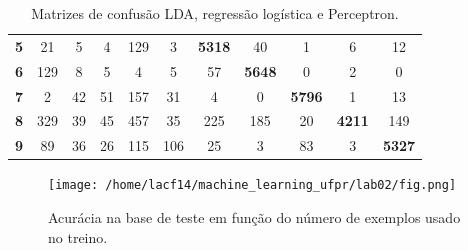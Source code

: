 \documentclass[
	12pt,				%
	openright,			%
	twoside,			%
	a4paper,			%
	english,			%
	brazil,				%
	svgnames
	]{abntex2}\usepackage[]{graphicx}\usepackage[]{color}
\begin{document}
\begin{table}[h]
\begin{tabular}{rcccccccccc}
\multicolumn{1}{r|}{\textbf{5}}          & 21                                 & 5                                  & 4                                  & 129                                & \multicolumn{1}{c|}{3}             & \multicolumn{1}{c|}{\textbf{5318}} & 40                                 & 1                                  & 6                                  & 12                                 \\ \cline{7-8}
\multicolumn{1}{r|}{\textbf{6}}          & 129                                & 8                                  & 5                                  & 4                                  & 5                                  & \multicolumn{1}{c|}{57}            & \multicolumn{1}{c|}{\textbf{5648}} & 0                                  & 2                                  & 0                                  \\ \cline{8-9}
\multicolumn{1}{r|}{\textbf{7}}          & 2                                  & 42                                 & 51                                 & 157                                & 31                                 & 4                                  & \multicolumn{1}{c|}{0}             & \multicolumn{1}{c|}{\textbf{5796}} & 1                                  & 13                                 \\ \cline{9-10}
\multicolumn{1}{r|}{\textbf{8}}          & 329                                & 39                                 & 45                                 & 457                                & 35                                 & 225                                & 185                                & \multicolumn{1}{c|}{20}            & \multicolumn{1}{c|}{\textbf{4211}} & 149                                \\ \cline{10-11} 
\multicolumn{1}{r|}{\textbf{9}}          & 89                                 & 36                                 & 26                                 & 115                                & 106                                & 25                                 & 3                                  & 83                                 & \multicolumn{1}{c|}{3}             & \multicolumn{1}{c|}{\textbf{5327}} \\ \hline
\end{tabular}
\caption{Matrizes de confusão LDA, regressão logística e Perceptron.}
\label{tab:cm2}
\end{table}

\begin{landscape}

\begin{figure}[]
\label{fig:fig1}
\centering
\texttt{[image: /home/lacf14/machine\_learning\_ufpr/lab02/fig.png]}
\caption{Acurácia na base de teste em função do número de exemplos usado no treino.}
\end{figure}
\end{landscape}
\end{document}
